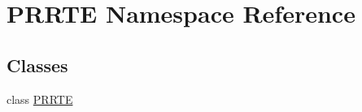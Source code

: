\hypertarget{namespace_p_r_r_t_e}{\section{P\-R\-R\-T\-E Namespace Reference}
\label{namespace_p_r_r_t_e}
}
\subsection*{Classes}
\begin{DoxyCompactItemize}
\item 
class \hyperlink{class_p_r_r_t_e_1_1_p_r_r_t_e}{P\-R\-R\-T\-E}
\end{DoxyCompactItemize}
